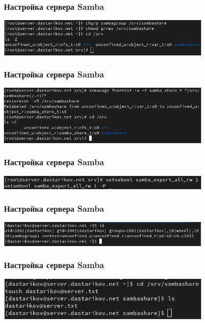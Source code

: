 \begin{frame}
\frametitle{Настройка сервера Samba}
    \includegraphics[width=0.8\textwidth]{../images/image06.png}
\end{frame}


\begin{frame}
\frametitle{Настройка сервера Samba}
    \includegraphics[width=0.8\textwidth]{../images/image08.png}
\end{frame}


\begin{frame}
\frametitle{Настройка сервера Samba}
    \includegraphics[width=0.8\textwidth]{../images/image09.png}
\end{frame}


\begin{frame}
\frametitle{Настройка сервера Samba}
    \includegraphics[width=0.8\textwidth]{../images/image10.png}
\end{frame}


\begin{frame}
\frametitle{Настройка сервера Samba}
    \includegraphics[width=0.8\textwidth]{../images/image11.png}
\end{frame}


